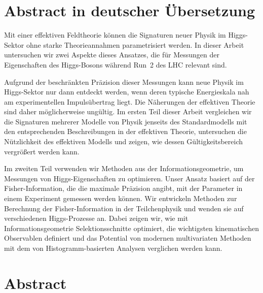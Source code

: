 

\chapter*{Abstract in deutscher \"{U}bersetzung}

Mit einer effektiven Feldtheorie k\"onnen die Signaturen neuer Physik
im Higgs-Sektor ohne starke Theorieannahmen parametrisiert werden. In
dieser Arbeit untersuchen wir zwei Aspekte dieses Ansatzes, die f\"ur
Messungen der Eigenschaften des Higgs-Bosons w\"ahrend Run~2 des LHC
relevant sind.

Aufgrund der beschr\"ankten Pr\"azision dieser Messungen kann neue
Physik im Higgs-Sektor nur dann entdeckt werden, wenn deren typische
Energieskala nah am experimentellen Impuls\"ubertrag liegt. Die
N\"aherungen der effektiven Theorie sind daher m\"oglicherweise
ung\"ultig. Im ersten Teil dieser Arbeit vergleichen wir die
Signaturen mehrerer Modelle von Physik jenseits des Standardmodells
mit den entsprechenden Beschreibungen in der effektiven Theorie,
untersuchen die N\"utzlichkeit des effektiven Modells und zeigen, wie
dessen G\"ultigkeitsbereich vergr\"o\ss{}ert werden kann.

Im zweiten Teil verwenden wir Methoden aus der Informationsgeometrie,
um Messungen von Higgs-Eigenschaften zu optimieren. Unser Ansatz
basiert auf der Fisher-Information, die die maximale Pr\"azision
angibt, mit der Parameter in einem Experiment gemessen werden
k\"onnen. Wir entwickeln Methoden zur Berechnung der
Fisher-Information in der Teilchenphysik und wenden sie auf
verschiedenen Higgs-Prozesse an. Dabei zeigen wir, wie mit
Informationsgeometrie Selektionsschnitte optimiert, die wichtigsten
kinematischen Observablen definiert und das Potential von modernen
multivariaten Methoden mit dem von Histogramm-basierten Analysen
verglichen werden kann.




\chapter*{Abstract}

